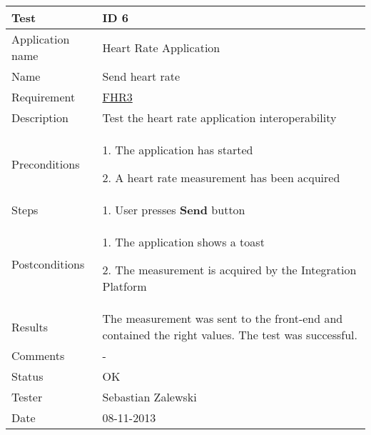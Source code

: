 \begin{table}
\begin{center}
\begin{tabular}{ | l | p{10cm} | }
	\hline
	\textbf{Test}	&	\textbf{ID 6} \\
	\hline\noalign{\smallskip}\noalign{\smallskip}\hline
	Application name	& Heart Rate Application \\
	Name				& Send heart rate \\
	Requirement			& \hyperref[table:reqheartrate]{FHR3} \\
	Description			& Test the heart rate application interoperability \\
	Preconditions		&	\par 1. The application has started
							\par 2. A heart rate measurement has been acquired \\
	Steps 				&	\par 1. User presses \textbf{Send} button \\
	Postconditions		&	\par 1. The application shows a toast
							\par 2. The measurement is acquired by the Integration Platform \\
	Results				& The measurement was sent to the front-end and contained the right values.
						  The test was successful. \\
	Comments			& - \\
	Status				& OK \\
	Tester				& Sebastian Zalewski \\
	Date				& 08-11-2013 \\
	\hline
\end{tabular}
\end{center}
\end{table}



